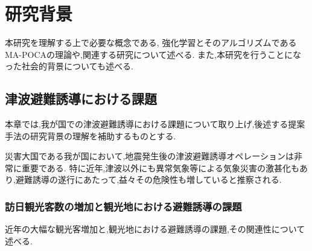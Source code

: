 \chapter{研究背景}

本研究を理解する上で必要な概念である, 強化学習とそのアルゴリズムであるMA-POCAの理論や,関連する研究について述べる.
また,本研究を行うことになった社会的背景についても述べる.

\section{津波避難誘導における課題}
本章では,我が国での津波避難誘導における課題について取り上げ,後述する提案手法の研究背景の理解を補助するものとする.\par 

災害大国である我が国において,地震発生後の津波避難誘導オペレーションは非常に重要である.
特に近年,津波以外にも異常気象等による気象災害の激甚化もあり,避難誘導の遂行にあたって,益々その危険性も増していると推察される.\par 

\subsection{訪日観光客数の増加と観光地における避難誘導の課題}
近年の大幅な観光客増加と,観光地における避難誘導の課題,その関連性について述べる.
